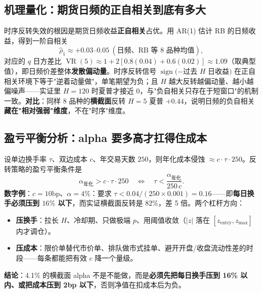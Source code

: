 \documentclass[UTF8,11pt]{ctexart}
\begin{document}
\subsection{机理量化：期货日频的正自相关到底有多大}
时序反转失效的根因是期货日频收益\textbf{正自相关}占优。用 AR(1) 估计 RB 的日频收益，得到一阶自相关
\begin{equation}
\hat\rho_1 \approx +0.03\text{--}0.05\ (\text{日频、RB 等 8 品种均值}),
\end{equation}
对应的 $q$ 日方差比 $\operatorname{VR}(5)\approx1+2[0.8(0.04)+0.6(0.02)]\approx1.09$（取典型值），即日频价差整体\textbf{发散偏动量}。时序反转信号 $\operatorname{sign}(-$过去 $H$ 日收益$)$ 在正自相关环境下等于"逆着动量做"，单笔期望为负；且 $H$ 越大反转越偏动量、越小越偏噪声——实证里 $H=120$ 时夏普才接近 0，与"负自相关只存在于短窗口"的机制一致。\textbf{对比}：同样 8 品种的\textbf{横截面}反转 $H=5$ 夏普 $+0.44$，说明日频的负自相关\textbf{藏在"相对强弱"维度}，不在"时序"维度。

\subsection{盈亏平衡分析：alpha 要多高才扛得住成本}
设单边换手率 $\tau$、双边成本 $c$、年交易天数 $250$，则年化成本侵蚀 $\approx c\cdot\tau\cdot250$。反转策略的盈亏平衡条件是
\begin{equation}
\alpha_{\text{年化}} > c\cdot\tau\cdot250 \quad\Longleftrightarrow\quad \tau < \frac{\alpha_{\text{年化}}}{250\,c}.
\end{equation}
\textbf{数字例}：$c=10$bp、$\alpha=4\%$：要求 $\tau<0.04/(250\times0.001)=0.16$——即\textbf{每日换手必须压到 $16\%$ 以下}，而实证横截面反转是 $82\%$，差 5 倍。两个杠杆方向：
\begin{itemize}[itemsep=2pt]
\item \textbf{压换手}：拉长 $H$、冷却期、只做极端 $p$、用阈值收敛（$|z|$ 落在 $[z_{\text{entry}},z_{\max}]$ 内才调仓）。
\item \textbf{压成本}：限价单替代市价单、排队做市式挂单、避开开盘/收盘流动性差的时段——每条都能把有效 $c$ 降一个量级。
\end{itemize}
\textbf{结论}：4.1\% 的横截面 alpha 不是不能做，而是\textbf{必须先把每日换手压到 16\% 以内、或把成本压到 2bp 以下}，否则净值在扣成本后为负。

\appendix
\end{document}
